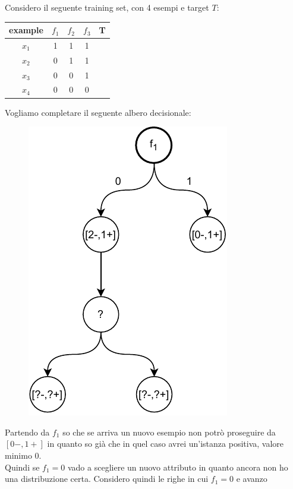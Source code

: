 \begin{esercizio}
  Considero il seguente training set, con 4 esempi e target $T$:
  \begin{table}[H]
    \centering
    \begin{tabular}{c|c|c|c|c}
      example & $f_1$ & $f_2$ & $f_3$ & T\\
      \hline
      $x_1$ & 1 & 1 & 1 & \color{darkgreen}{1}\\
      $x_2$ & 0 & 1 & 1 & \color{red}{0}\\
      $x_3$ & 0 & 0 & 1 & \color{darkgreen}{1}\\
      $x_4$ & 0 & 0 & 0 & \color{red}{0}\\
    \end{tabular}
  \end{table}
  Vogliamo completare il seguente albero decisionale:
  \begin{figure}[H]
    \centering
    \includegraphics[scale = 0.75]{img/id5.pdf}
  \end{figure}
  Partendo da $f_1$ so che se arriva un nuovo esempio non potrò proseguire da
  $[0-, 1+]$ in quanto so già che in quel caso avrei un'istanza positiva, valore
  minimo $0$.\\
  Quindi se $f_1=0$ vado a scegliere un nuovo attributo in quanto ancora non ho
  una distribuzione certa. Considero quindi le righe in cui $f_1=0$ e avanzo

\end{esercizio}
